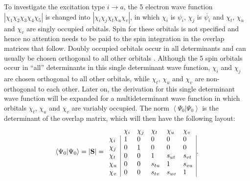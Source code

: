 To investigate the excitation type $i \rightarrow a$, the 5 electron wave function $|\chi_1\chi_2\chi_3\chi_4\chi_5|$ is changed into $|\chi_i\chi_j\chi_t\chi_u\chi_v|$, in which $\chi_i$ is $\psi_i$, $\chi_j$ is $\overline{\psi_i}$ and $\chi_t$, $\chi_u$ and $\chi_v$ are singly occupied orbitals. Spin for these orbitals is not specified and hence no attention needs to be paid to the spin integration in the overlap matrices that follow. Doubly occupied orbitals occur in all determinants and can usually be chosen orthogonal to all other orbitals \cite{koos1}. Although the 5 spin orbitals occur in ``all'' determinants in this single determinant wave function, $\chi_i$ and $\chi_j$ are chosen orthogonal to all other orbitals, while $\chi_t$, $\chi_u$ and $\chi_v$ are non-orthogonal to each other. Later on, the derivation for this single determinant wave function will be expanded for a multideterminant wave function in which orbitals $\chi_t$, $\chi_u$ and $\chi_v$ are variably occupied. The norm $\left < \Psi_0 | \Psi_0 \right>$ is the determinant of the overlap matrix, which will then have the following layout:
\begin{equation}
\left < \Psi_0 | \Psi_0 \right> = | \mathbf{S} | =
\begin{array}{llllll}
 &  \chi_i & \chi_j & \chi_t & \chi_u & \chi_v \\
 \chi_i & \multicolumn{1}{|l}{ 1 } & 0 & 0 & 0 & \multicolumn{1}{l|}{ 0 } \\
 \chi_j & \multicolumn{1}{|l}{ 0 } & 1 & 0 & 0 & \multicolumn{1}{l|}{ 0 } \\
 \chi_t & \multicolumn{1}{|l}{ 0 } & 0 & 1 & s_{ut} & \multicolumn{1}{l|}{s_{vt}} \\
 \chi_u & \multicolumn{1}{|l}{ 0 } & 0 & s_{tu} & 1 & \multicolumn{1}{l|}{s_{vu}} \\
 \chi_v & \multicolumn{1}{|l}{ 0 } & 0 & s_{tv} & s_{uv} & \multicolumn{1}{l|}{1}
\end{array}.
\label{ch2.eq.s0}
\end{equation}


